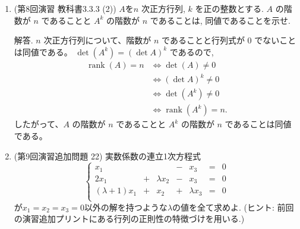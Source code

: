 \documentclass[dvipdfmx,a4paper,11pt]{article} %
\theoremstyle{definition}
\begin{document}
\begin{enumerate}[label=\textbf{問題}\arabic*.]
解答(4).
両辺の行列式を取ると、
\begin{align*}
1
&=\det(E_n)\\
&=\det({}^{t}AA)\\
&=\det({}^{t}A)\det(A)\\
&=\det(A)\det(A)\\
&=(\det A)^2.
\end{align*}
ここで $\det({}^{t}A)=\det(A)$ を用いた。$\det(A)$ は実数であるから、
\[
\boxed{\det(A)=\pm1}
\]
である。

解答(5).
両辺の行列式を取ると、
\[
(\det A)^7=\det(A^7)=\det(E_n)=1.
\]
$\det(A)$ は実数であり、実数 $t$ に対して $t^7=1$ ならば $t=1$ である。したがって
\[
\boxed{\det(A)=1}
\]
である。

解答(6).
$\theta=\dfrac{2\pi}{7}$ とし、
\[
A=
\begin{pmatrix}
\cos\theta&-\sin\theta\\
\sin\theta&\cos\theta
\end{pmatrix}
\]
とおく。これは角度 $\theta$ の回転を表す行列であるから、$A^7$ は角度 $7\theta=2\pi$ の回転を表す。したがって
\[
A^7=E_2.
\]
一方、$0<\theta<2\pi$ であるから $A\neq E_2$ である。よって一例は
\[
\boxed{
A=
\begin{pmatrix}
\cos\dfrac{2\pi}{7}&-\sin\dfrac{2\pi}{7}\\[4pt]
\sin\dfrac{2\pi}{7}&\cos\dfrac{2\pi}{7}
\end{pmatrix}}
\]
である。


\item (第8回演習 教科書3.3.3 (2)) $A$を$n$ 次正方行列, $k$ を正の整数とする. 
$A$ の階数が $n$ であることと $A^k$ の階数が $n$ であることは, 同値であることを示せ.

解答. $n$ 次正方行列について、階数が $n$ であることと行列式が $0$ でないことは同値である。
\(
\det(A^k)=(\det A)^k
\)
であるので, 
\begin{align*}
\operatorname{rank}(A)=n
&\Longleftrightarrow \det(A)\neq0\\
&\Longleftrightarrow (\det A)^k\neq0\\
&\Longleftrightarrow \det(A^k)\neq0\\
&\Longleftrightarrow \operatorname{rank}(A^k)=n.
\end{align*}
したがって、$A$ の階数が $n$ であることと $A^k$ の階数が $n$ であることは同値である。

\item (第9回演習追加問題 22) 実数係数の連立1次方程式
 $$
 \left\{ 
\begin{matrix}
x_1&  &  &  -& x_3&= & 0\\
2x_1&+&\lambda x_2& -&x_3&= & 0\\
(\lambda + 1)x_1& +&x_2& + &\lambda x_3&=&0\\
\end{matrix}
\right.
 $$
 が$x_1=x_2=x_3=0$以外の解を持つような$\lambda$の値を全て求めよ.
 (ヒント:  前回の演習追加プリントにある行列の正則性の特徴づけを用いる.)


\end{enumerate}
\end{document}
